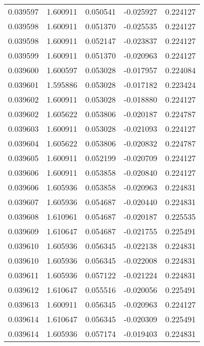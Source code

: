 \begin{tabular}{lrrrr}
0.039597    &  1.600911 &  0.050541 & -0.025927 &             0.224127 \\
0.039598    &  1.600911 &  0.051370 & -0.025535 &             0.224127 \\
0.039598    &  1.600911 &  0.052147 & -0.023837 &             0.224127 \\
0.039599    &  1.600911 &  0.051370 & -0.020963 &             0.224127 \\
0.039600    &  1.600597 &  0.053028 & -0.017957 &             0.224084 \\
0.039601    &  1.595886 &  0.053028 & -0.017182 &             0.223424 \\
0.039602    &  1.600911 &  0.053028 & -0.018880 &             0.224127 \\
0.039602    &  1.605622 &  0.053806 & -0.020187 &             0.224787 \\
0.039603    &  1.600911 &  0.053028 & -0.021093 &             0.224127 \\
0.039604    &  1.605622 &  0.053806 & -0.020832 &             0.224787 \\
0.039605    &  1.600911 &  0.052199 & -0.020709 &             0.224127 \\
0.039606    &  1.600911 &  0.053858 & -0.020840 &             0.224127 \\
0.039606    &  1.605936 &  0.053858 & -0.020963 &             0.224831 \\
0.039607    &  1.605936 &  0.054687 & -0.020440 &             0.224831 \\
0.039608    &  1.610961 &  0.054687 & -0.020187 &             0.225535 \\
0.039609    &  1.610647 &  0.054687 & -0.021755 &             0.225491 \\
0.039610    &  1.605936 &  0.056345 & -0.022138 &             0.224831 \\
0.039610    &  1.605936 &  0.056345 & -0.022008 &             0.224831 \\
0.039611    &  1.605936 &  0.057122 & -0.021224 &             0.224831 \\
0.039612    &  1.610647 &  0.055516 & -0.020056 &             0.225491 \\
0.039613    &  1.600911 &  0.056345 & -0.020963 &             0.224127 \\
0.039614    &  1.610647 &  0.056345 & -0.020309 &             0.225491 \\
0.039614    &  1.605936 &  0.057174 & -0.019403 &             0.224831 \\

\end{tabular}
